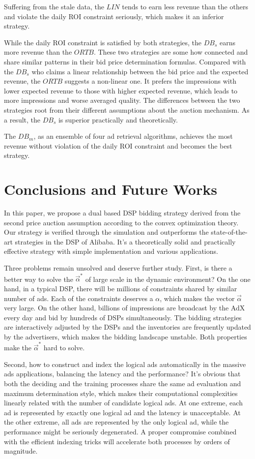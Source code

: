 \documentclass{article}
\newcommand{\valpha}{\vec{\alpha}}
\begin{document}
Suffering from the stale data, the $LIN$ tends to
    earn less revenue than the others and violate the daily ROI constraint seriously,
    which makes it an inferior strategy.

While the daily ROI constraint is satisfied by both strategies,
    the $DB_s$ earns more revenue than the $ORTB$.
These two strategies are some how connected and share similar patterns in their bid price determination formulas.
Compared with the $DB_s$ who claims a linear relationship between the bid price and the expected revenue,
    the $ORTB$ suggests a non-linear one.
It prefers the impressions with lower expected revenue to those with higher expected revenue,
    which leads to more impressions and worse averaged quality.
The differences between the two strategies root from their different assumptions about the auction mechanism.
As a result, the $DB_s$ is superior practically and theoretically.

The $DB_m$, as an ensemble of four ad retrieval algorithms,
    achieves the most revenue without violation of the daily ROI constraint and becomes the best strategy.

\section{Conclusions and Future Works}

In this paper, we propose a dual based DSP bidding strategy
    derived from the second price auction assumption according to the convex optimization theory.
Our strategy is verified through the simulation and outperforms the state-of-the-art strategies in the DSP of Alibaba.
It's a theoretically solid and practically effective strategy with simple implementation and various applications.

Three problems remain unsolved and deserve further study.
First, is there a better way to solve the $\valpha^*$ of large scale in the dynamic environment?
On the one hand, in a typical DSP, there will be millions of constraints shared by similar number of ads.
Each of the constraints deserves a $\alpha$, which makes the vector $\valpha$ very large.
On the other hand, billions of impressions are broadcast by the AdX every day and bid by hundreds of DSPs simultaneously.
The bidding strategies are interactively adjusted by the DSPs and the inventories are frequently updated by the advertisers,
    which makes the bidding landscape unstable.
Both properties make the $\valpha^*$ hard to solve.

Second, how to construct and index the logical ads automatically in the massive ads applications, balancing the latency and the performance?
It's obvious that both the deciding and the training processes share the same ad evaluation and maximum determination style,
    which makes their computational complexities linearly related with the number of candidate logical ads.
At one extreme, each ad is represented by exactly one logical ad and the latency is unacceptable.
At the other extreme, all ads are represented by the only logical ad, while the performance might be seriously degenerated.
A proper compromise combined with the efficient indexing tricks will accelerate both processes by orders of magnitude.
\end{document}
